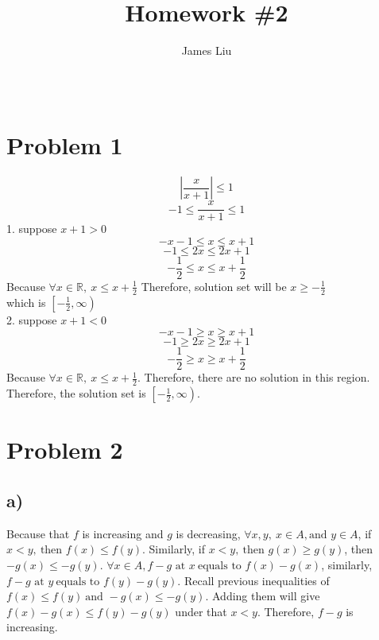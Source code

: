 \documentclass[a4paper,fleqn]{article}
\title{\textbf{Homework \#2 }}
\author{James Liu}
\date{\ }
\begin{document}
\maketitle


\section*{Problem 1}
    
    \[
        \left |\frac{x}{x+1} \right |\leqslant 1 
    \]\[
        -1 \leqslant \frac{x}{x+1} \leqslant 1 
    \]
    1. suppose \(x+1 > 0\)
    \[
    -x-1 \leqslant x \leqslant x+1    
    \]\[
    -1 \leqslant 2x \leqslant 2x+1    
    \]\[
    - \frac {1} {2} \leqslant x\leqslant x+\frac1 2
    \]
    Because 
    \(\forall x \in \mathbb{R},\  x \leqslant x + \frac 1 2\)
    Therefore, solution set will be \(x\geqslant -\frac 1 2\) \\
    which is \(\left[-\frac 1 2, \infty\right)\)\\
    2. suppose \(x+1 < 0\)
    \[
    -x-1 \geqslant x \geqslant x+1    
    \]\[
    -1 \geqslant 2x \geqslant 2x+1    
    \]\[
    - \frac {1} {2} \geqslant x\geqslant x+\frac1 2
    \]
    Because
    \(\forall x \in \mathbb{R},\  x \leqslant x + \frac 1 2\). Therefore, there are no solution in this region.
    Therefore, the solution set is \(\left[-\frac 1 2, \infty\right)\).

\section*{Problem 2}
    \subsection*{a)}
        Because that \(f\) is increasing and \(g\) is decreasing, \(\forall x,y, \ x\in A, \text{and } y\in A \),
        if \(x<y, \ \text{then }f(x)\leqslant f(y)\). Similarly, if \( x<y, \ \text{then } g(x)\geqslant g(y)\), then \(-g(x)\leqslant -g(y)\).
        \(\forall x \in A, f-g \text{ at }x \ \text{equals to } f(x)-g(x)\), similarly, \(f-g \text{ at }y \ \text{equals to } f(y)-g(y)\).
        Recall previous inequalities of \(f(x)\leqslant f(y)\ \text{and } -g(x)\leqslant -g(y) \). Adding them will give
        \(f(x)-g(x) \leqslant f(y)-g(y)\) under that \(x<y\). Therefore, \(f-g\) is increasing.
    
\end{document}
